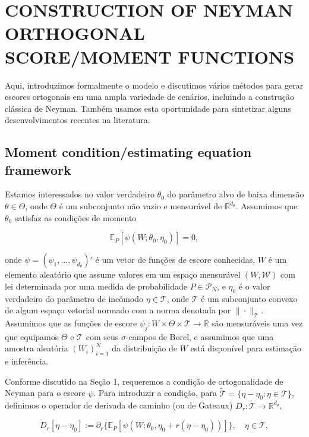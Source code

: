 \documentclass[a4paper,12pt]{article}[abntex2]
\begin{document}
\section{CONSTRUCTION  OF NEYMAN  ORTHOGONAL  SCORE/MOMENT FUNCTIONS}

Aqui, introduzimos formalmente o modelo e discutimos vários métodos para gerar escores ortogonais em uma ampla variedade de cenários, incluindo a construção clássica de Neyman. Também usamos esta oportunidade para sintetizar alguns desenvolvimentos recentes na literatura.

\subsection{Moment  condition/estimating  equation  framework}

Estamos interessados no valor verdadeiro $\theta_0$ do parâmetro alvo de baixa dimensão $\theta \in \Theta$, onde $\Theta$ é um subconjunto não vazio e mensurável de $\mathbb{R}^{d_\theta}$. Assumimos que $\theta_0$ satisfaz as condições de momento

\[
\mathbb{E}_P[\psi(W; \theta_0, \eta_0)] = 0,
\]

onde $\psi = (\psi_1, \ldots, \psi_{d_\theta})'$ é um vetor de funções de escore conhecidas, $W$ é um elemento aleatório que assume valores em um espaço mensurável $(W, \mathcal{W})$ com lei determinada por uma medida de probabilidade $P \in \mathcal{P}_N$, e $\eta_0$ é o valor verdadeiro do parâmetro de incômodo $\eta \in \mathcal{T}$, onde $\mathcal{T}$ é um subconjunto convexo de algum espaço vetorial normado com a norma denotada por $\|\cdot\|_{\mathcal{T}}$. Assumimos que as funções de escore $\psi_j: W \times \Theta \times \mathcal{T} \rightarrow \mathbb{R}$ são mensuráveis uma vez que equipamos $\Theta$ e $\mathcal{T}$ com seus $\sigma$-campos de Borel, e assumimos que uma amostra aleatória $(W_i)_{i=1}^N$ da distribuição de $W$ está disponível para estimação e inferência.

Conforme discutido na Seção 1, requeremos a condição de ortogonalidade de Neyman para o escore $\psi$. Para introduzir a condição, para $\tilde{\mathcal{T}} = \{\eta - \eta_0 : \eta \in \mathcal{T}\}$, definimos o operador de derivada de caminho (ou de Gateaux) $D_r: \tilde{\mathcal{T}} \rightarrow \mathbb{R}^{d_\theta}$,

\[
D_r[\eta - \eta_0] := \partial_r \{\mathbb{E}_P[\psi(W; \theta_0, \eta_0 + r(\eta - \eta_0))]\}, \quad \eta \in \mathcal{T},
\]
\end{document}
